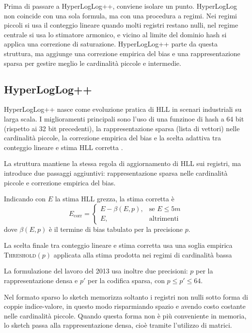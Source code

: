 Prima di passare a HyperLogLog++, conviene isolare un punto. HyperLogLog non
coincide con una sola formula, ma con una procedura a regimi. Nei regimi piccoli
si usa il conteggio lineare quando molti registri restano nulli, nel regime
centrale si usa lo stimatore armonico, e vicino al limite del dominio hash si
applica una correzione di saturazione. HyperLogLog++ parte da questa struttura,
ma aggiunge una correzione empirica del bias e una rappresentazione sparsa per
gestire meglio le cardinalità piccole e intermedie.

\subsection{HyperLogLog++}
HyperLogLog++ nasce come evoluzione pratica di HLL in scenari industriali su
larga scala. I miglioramenti principali sono l'uso di una funzinoe di hash a 64 bit (rispetto ai 32 bit precedenti), la
rappresentazione sparsa (lista di vettori) nelle cardinalità piccole, la correzione empirica del
bias e la scelta adattiva tra conteggio lineare e stima HLL corretta
\cite{Heule_Nunkesser_Hall_2013}.

\begin{definition}[HyperLogLog++]
La struttura mantiene la stessa regola di aggiornamento di HLL sui registri, ma
introduce due passaggi aggiuntivi: rappresentazione sparsa nelle cardinalità
piccole e correzione empirica del bias.

Indicando con $E$ la stima HLL grezza, la stima corretta è
\[
E_{\mathrm{corr}}=
\begin{cases}
E-\beta(E,p), & \text{se } E\le 5m \\[1mm]
E, & \text{altrimenti}
\end{cases}
\]
dove $\beta(E,p)$ è il termine di bias tabulato per la precisione $p$.

La scelta finale tra conteggio lineare e stima corretta usa una soglia empirica
\textsc{Threshold}$(p)$ applicata alla stima prodotta nei regimi di cardinalità
bassa

La formulazione del lavoro del 2013 usa inoltre due precisioni: $p$ per la
rappresentazione densa e $p'$ per la codifica sparsa, con $p \le p' \le 64$.
\end{definition}

Nel formato sparso lo sketch memorizza soltanto i registri non nulli sotto
forma di coppie indice-valore, in questo modo risparmiando spazio e avendo costo costante nelle cardinalità piccole. Quando questa forma non è più conveniente in
memoria, lo sketch passa alla rappresentazione densa, cioè tramite l'utilizzo di matrici.


